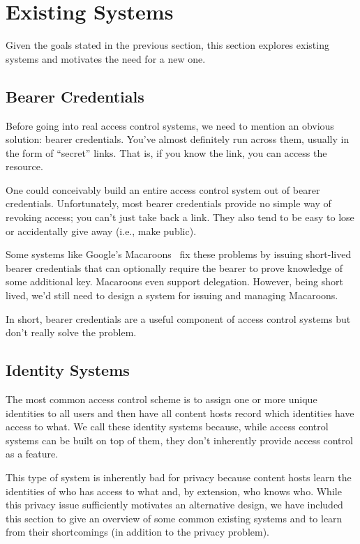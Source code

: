 \documentclass[pdftex,12pt,a4papaer]{report}
\begin{document}
\section{Existing Systems} 

Given the goals stated in the previous section, this section explores existing
systems and motivates the need for a new one.

\subsection{Bearer Credentials}

Before going into real access control systems, we need to mention an obvious
solution: bearer credentials. You've almost definitely run across them, usually
in the form of ``secret'' links. That is, if you know the link, you can access
the resource.

One could conceivably build an entire access control system out of bearer
credentials. Unfortunately, most bearer credentials provide no simple way of
revoking access; you can't just take back a link. They also tend to be easy to
lose or accidentally give away (i.e., make public).

Some systems like Google's Macaroons~\cite{macaroon} fix these problems by
issuing short-lived bearer credentials that can optionally require the bearer to
prove knowledge of some additional key. Macaroons even support delegation.
However, being short lived, we'd still need to design a system for issuing and
managing Macaroons.

In short, bearer credentials are a useful component of access control systems
but don't really solve the problem.

\subsection{Identity Systems}

The most common access control scheme is to assign one or more unique identities
to all users and then have all content hosts record which identities have access
to what. We call these identity systems because, while access control systems
can be built on top of them, they don't inherently provide access control as a
feature.

This type of system is inherently bad for privacy because content hosts learn
the identities of who has access to what and, by extension, who knows who. While
this privacy issue sufficiently motivates an alternative design, we have
included this section to give an overview of some common existing systems and to
learn from their shortcomings (in addition to the privacy problem).
\end{document}
